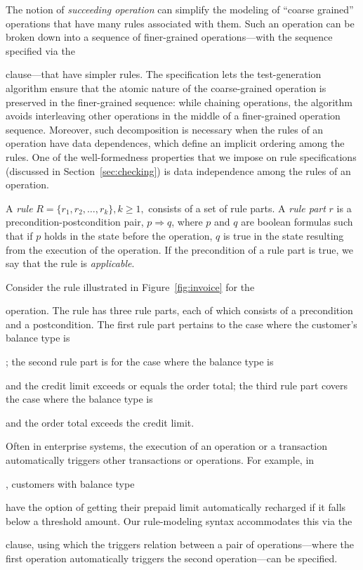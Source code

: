 The notion of \textit{succeeding operation} can simplify the modeling of
``coarse grained'' operations that have many rules associated with them. Such an
operation can be broken down into a sequence of finer-grained operations---with
the sequence specified via the \subject{next} clause---that have simpler
rules. The specification lets the test-generation algorithm ensure that the
atomic nature of the coarse-grained operation is preserved in the finer-grained
sequence: while chaining operations, the algorithm avoids interleaving other
operations in the middle of a finer-grained operation sequence.  Moreover, such
decomposition is necessary when the rules of an operation have data dependences,
which define an implicit ordering among the rules. One of the well-formedness
properties that we impose on rule specifications (discussed in
Section~\ref{sec:checking}) is data independence among the rules of an
operation.

A \textit{rule} $R = \{r_1, r_2, \ldots, r_k\}, k \geq 1,$ consists of a set of
rule parts. A \textit{rule part} $r$ is a precondition-postcondition pair, $p
\Longrightarrow q$, where $p$ and $q$ are boolean formulas such that if $p$
holds in the state before the operation, $q$ is true in the state resulting from
the execution of the operation. If the precondition of a rule part is true, we
say that the rule is \textit{applicable}.

Consider the rule illustrated in Figure~\ref{fig:invoice} for the
\subject{Compute Invoice Total} operation. The rule has three rule parts, each
of which consists of a precondition and a postcondition. The first rule part
pertains to the case where the customer's balance type is \subject{None}; the
second rule part is for the case where the balance type is \subject{Credit} and
the credit limit exceeds or equals the order total; the third rule part covers
the case where the balance type is \subject{Credit} and the order total exceeds
the credit limit.

Often in enterprise systems, the execution of an operation or a transaction
automatically triggers other transactions or operations. For example, in
\subject{jBilling}, customers with balance type \subject{Prepaid} have the
option of getting their prepaid limit automatically recharged if it falls below
a threshold amount. Our rule-modeling syntax accommodates this via the
\subject{Triggers} clause, using which the triggers relation between a pair of
operations---where the first operation automatically triggers the second
operation---can be specified.

